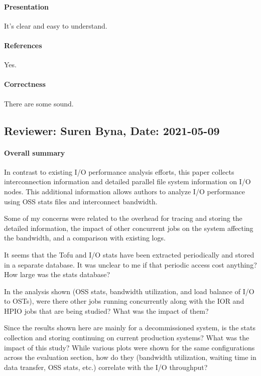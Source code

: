 \documentclass{jhps}
\begin{document}
\paragraph{Presentation}
It's clear and easy to understand.
\paragraph{References}   %
Yes.
\paragraph{Correctness}   %
There are some sound.


\subsection*{Reviewer: Suren Byna, Date: 2021-05-09}

\paragraph{Overall summary}

In contrast to existing I/O performance analysis efforts, this paper collects interconnection information and detailed parallel file system information on I/O nodes. This additional information allows authors to analyze I/O performance using OSS stats files and interconnect bandwidth. 

Some of my concerns were related to the overhead for tracing and storing the detailed information, the impact of other concurrent jobs on the system affecting the bandwidth, and a comparison with existing logs. 

It seems that the Tofu and I/O stats have been extracted periodically and stored in a separate database. It was unclear to me if that periodic access cost anything? How large was the stats database?

In the analysis shown (OSS stats, bandwidth utilization, and load balance of I/O to OSTs), were there other jobs running concurrently along with the IOR and HPIO jobs that are being studied? What was the impact of them?

Since the results shown here are mainly for a decommissioned system, is the stats collection and storing continuing on current production systems? What was the impact of this study? While various plots were shown for the same configurations across the evaluation section, how do they (bandwidth utilization, waiting time in data transfer, OSS stats, etc.) correlate with the I/O throughput? 
\end{document}
